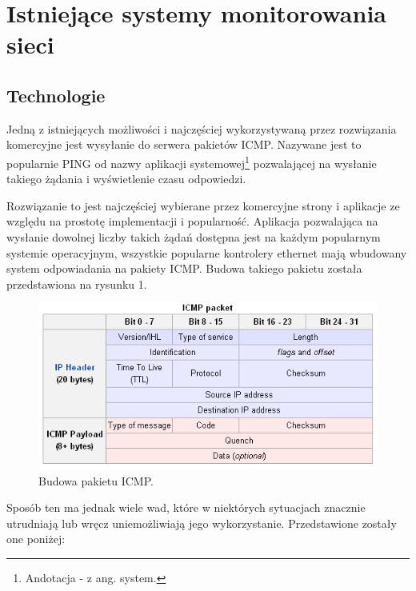 \chapter[Istniejące systemy monitorowania sieci.]{Istniejące systemy monitorowania sieci}

\section{Technologie}

Jedną z istniejących możliwości i najczęściej wykorzystywaną przez rozwiązania komercyjne jest wysyłanie do serwera pakietów ICMP. Nazywane jest to popularnie PING od nazwy aplikacji systemowej\footnote{Andotacja - z ang. system.} pozwalającej na wysłanie takiego żądania i wyświetlenie czasu odpowiedzi.

Rozwiązanie to jest najczęściej wybierane przez komercyjne strony i aplikacje ze względu na prostotę implementacji i popularność. Aplikacja pozwalająca na wysłanie dowolnej liczby takich żądań dostępna jest na każdym popularnym systemie operacyjnym, wszystkie popularne kontrolery ethernet mają wbudowany system odpowiadania na pakiety ICMP. Budowa takiego pakietu została przedstawiona na rysunku 1. 

\begin{figure}[H]
	\centering
	\includegraphics[width=\textwidth, bb = 0px 0px 535px 262px, keepaspectratio=true]{grafika/icmp_packet.jpg} 
	\caption{ Budowa pakietu ICMP. }
\end{figure}

Sposób ten ma jednak wiele wad, które w niektórych sytuacjach znacznie utrudniają lub wręcz uniemożliwiają jego wykorzystanie. Przedstawione zostały one poniżej:

